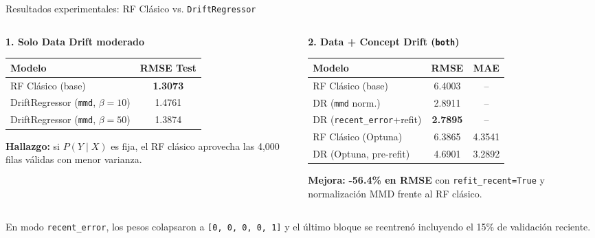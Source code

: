 \documentclass[aspectratio=169,11pt,table]{beamer}
\begin{document}
\begin{frame}{Resultados experimentales: RF Clásico vs. \texttt{DriftRegressor}}
\begin{columns}[T,onlytextwidth]
\begin{column}{0.46\textwidth}
\begin{ccdebox}
\scriptsize
\textbf{1. Solo Data Drift moderado}\\[0.06cm]
\centering
\begin{tabular}{@{}lc@{}}
\toprule
\textbf{Modelo} & \textbf{RMSE Test} \\
\midrule
RF Clásico (base) & \textbf{1.3073} \\
DriftRegressor (\texttt{mmd}, $\beta=10$) & 1.4761 \\
DriftRegressor (\texttt{mmd}, $\beta=50$) & 1.3874 \\
\bottomrule
\end{tabular}

\vspace{0.08cm}
\raggedright
\textbf{Hallazgo:} si $P(Y \mid X)$ es fija, el RF clásico aprovecha las 4,000 filas válidas con menor varianza.
\end{ccdebox}
\end{column}

\begin{column}{0.50\textwidth}
\begin{ccdebox}
\scriptsize
\textbf{2. Data + Concept Drift (\texttt{both})}\\[0.06cm]
\centering
\begin{tabular}{@{}lcc@{}}
\toprule
\textbf{Modelo} & \textbf{RMSE} & \textbf{MAE} \\
\midrule
RF Clásico (base) & 6.4003 & -- \\
DR (\texttt{mmd} norm.) & 2.8911 & -- \\
DR (\texttt{recent\_error}+refit) & \textbf{2.7895} & -- \\
\midrule
RF Clásico (Optuna) & 6.3865 & 4.3541 \\
DR (Optuna, pre-refit) & 4.6901 & 3.2892 \\
\bottomrule
\end{tabular}

\vspace{0.08cm}
\raggedright
\textbf{Mejora:} \textcolor{okgreen}{\textbf{-56.4\% en RMSE}} con \texttt{refit\_recent=True} y normalización MMD frente al RF clásico.
\end{ccdebox}
\end{column}
\end{columns}

\vspace{0.10cm}
\begin{keybox}
\scriptsize
En modo \texttt{recent\_error}, los pesos colapsaron a \texttt{[0, 0, 0, 0, 1]} y el último bloque se reentrenó incluyendo el 15\% de validación reciente.
\end{keybox}
\end{frame}
\end{document}
